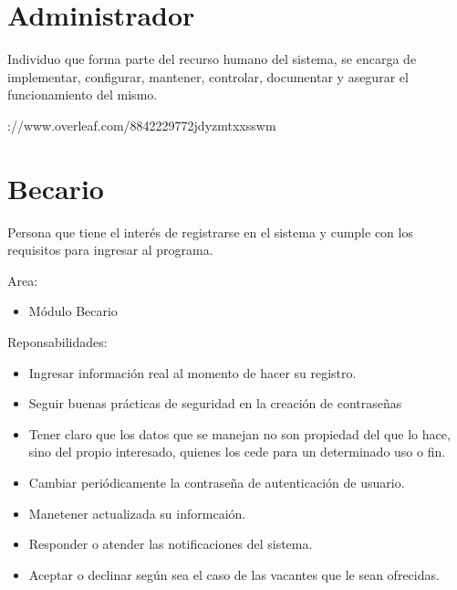 \begin{Actor}{\hypertarget{Actor: Administrador}{\section{Administrador}}}{
	Individuo que forma parte del recurso humano del sistema, se encarga de implementar, configurar, mantener, controlar, documentar y asegurar el funcionamiento del mismo.
}
\begin{list}{}{}
\begin{itemize}
 

    \end{itemize}
\end{list}
\end{Actor}

\newpagehttps://www.overleaf.com/8842229772jdyzmtxxsswm
\begin{Actor}{\hypertarget{Actor: Becario}{\section{Becario}}}{
	Persona que tiene el interés de registrarse en el sistema y cumple con los requisitos para ingresar al programa.
	
}
\begin{list}{}{}
    \item[Area:] \ISenter
    \begin{itemize}
		\item Módulo Becario
    \end{itemize}
    \item[Reponsabilidades:] \ISenter
    \begin{itemize}
        \item Ingresar información real al momento de hacer su registro.
        \item Seguir buenas prácticas de seguridad en la creación de contraseñas
        \item  Tener claro que los datos que se manejan no son propiedad del que lo hace, sino del propio interesado, quienes los cede para un determinado uso o fin.
        \item Cambiar periódicamente la contraseña de autenticación de usuario.
		\item Manetener actualizada su informcaión.
		\item Responder o atender las notificaciones del sistema.
		\item Aceptar o declinar según sea el caso de las vacantes que le sean ofrecidas.
    \end{itemize}
\end{list}
\end{Actor}

